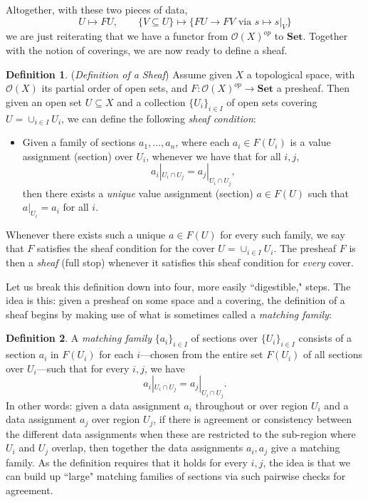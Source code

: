 \documentclass[a4paper]{book}
\theoremstyle{definition}
\theoremstyle{definition}
\newtheorem{definition}{Definition}[section]
\theoremstyle{definition}
\theoremstyle{theorem}
\theoremstyle{definition}
\begin{document}
		Altogether, with these two pieces of data, 
		\begin{equation}
		U \mapsto FU, \hspace{2em} \{V \subseteq U\} \mapsto \{FU \rightarrow FV \text{ via } s \mapsto s|_V \}
		\end{equation}
		we are just reiterating that we have a functor from $\mathscr{O}(X)^{op}$ to $\textbf{Set}$. Together with the notion of coverings, we are now ready to define a sheaf. 
			\begin{definition}
			(\textit{Definition of a Sheaf}) Assume given $X$ a topological space, with $\mathscr{O}(X)$ its partial order of open sets, and $F: \mathscr{O}(X)^{op} \rightarrow \textbf{Set}$ a presheaf. Then given an open set $U \subseteq  X$ and a collection $\{U_i\}_{i \in I}$ of open sets covering $U = \cup_{i \in I} U_i$, we can define the following \textit{sheaf condition}: 
			\begin{itemize}
				\item Given a family of sections $a_1, \dots, a_n$, where each $a_i \in F(U_i)$ is a value assignment (section) over $U_i$, whenever we have that for all $i, j$,
				\begin{equation*} a_i|_{U_i \cap U_j} = a_j|_{U_i \cap U_j}, 
				\end{equation*}
				then there exists a \textit{unique} value assignment (section) $a \in F(U)$ such that $a|_{U_i} = a_i$ for all $i$. 
			\end{itemize}  
			Whenever there exists such a unique $a \in F(U)$ for every such family, we say that $F$ satisfies the sheaf condition for the cover $U = \cup_{i \in I} U_i$.
			The presheaf $F$ is then a \textit{sheaf} (full stop) whenever it satisfies this sheaf condition for \textit{every} cover. 
		\end{definition}
			Let us break this definition down into four, more easily ``digestible," steps. The idea is this: given a presheaf on some space and a covering, the definition of a sheaf begins by making use of what is sometimes called a \textit{matching family}:
			\begin{definition}
				A \textit{matching family} $\{a_i\}_{i \in I}$ of sections over $\{U_i\}_{i \in I}$ consists of a section $a_i$ in $F(U_i)$ for each $i$---chosen from the entire set $F(U_i)$ of all sections over $U_i$---such that for every $i, j$, we have 
				\begin{equation*}
				a_i|_{U_i \cap U_j} = a_j|_{U_i \cap U_j}.
				\end{equation*} 
				In other words: given a data assignment $a_i$ throughout or over region $U_i$ and a data assignment $a_j$ over region $U_j$, if there is agreement or consistency between the different data assignments when these are restricted to the sub-region where $U_i$ and $U_j$ overlap, then together the data assignments $a_i, a_j$ give a matching family. As the definition requires that it holds for every $i, j$, the idea is that we can build up ``large" matching families of sections via such pairwise checks for agreement. 
			\end{definition}  
\end{document}
